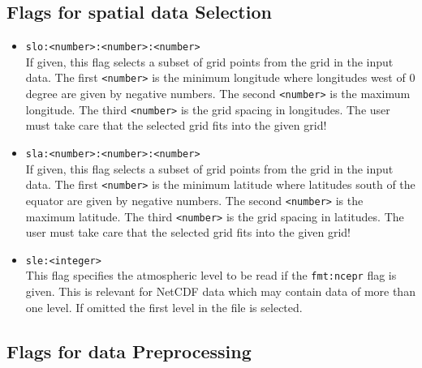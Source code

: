 \documentclass[12pt, oneside, a4paper, headsepline, plainheadsepline]{scrbook}
\begin{document}
\subsection{Flags for spatial data Selection}

\begin{itemize}

\item \verb+slo:<number>:<number>:<number>+ \\
        If given, this flag selects a subset of grid points from the grid in the input data.
        The first \verb+<number>+ is the minimum longitude where
        longitudes west of 0 degree are given by negative numbers.
        The second \verb+<number>+ is the maximum longitude. The third
        \verb+<number>+ is the grid spacing in longitudes.
        The user must take care that the selected grid fits into the given grid!

\item \verb+sla:<number>:<number>:<number>+ \\
        If given, this flag selects a subset of grid points from the grid in the input data.
        The first \verb+<number>+ is the minimum latitude where
        latitudes south of the equator are given by negative numbers.
        The second \verb+<number>+ is the maximum latitude. The third
        \verb+<number>+ is the grid spacing in latitudes.
        The user must take care that the selected grid fits into the given grid!


\item \verb+sle:<integer>+ \\
		This flag specifies the atmospheric level to be read
        if the \verb+fmt:ncepr+ flag is given. This is relevant for NetCDF data which may contain data of more than one level.
        If omitted the first level in the file is selected.

\end{itemize}
\subsection{Flags for data Preprocessing}
\end{document}
